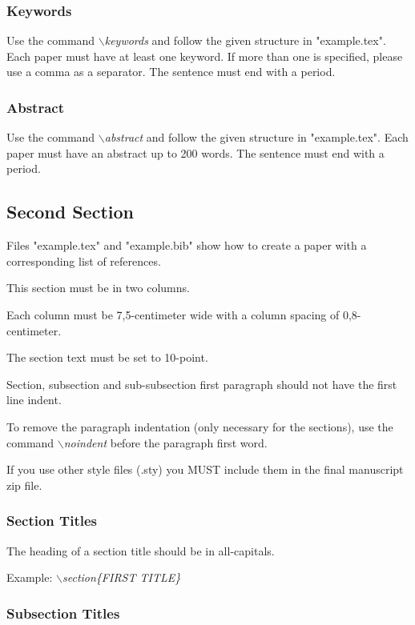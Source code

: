 \documentclass[a4paper,twoside]{article}
\begin{document}
\subsubsection{Keywords}

Use the command \textit{$\backslash$keywords} and follow the given structure in "example.tex". Each paper must have at least one keyword. If more than one is specified, please use a comma as a separator. The sentence must end with a period.

\subsubsection{Abstract}

Use the command \textit{$\backslash$abstract} and follow the given structure in "example.tex".
Each paper must have an abstract up to 200 words. The sentence
must end with a period.

\subsection{Second Section}

Files "example.tex" and "example.bib" show how to create a paper
with a corresponding list of references.

This section must be in two columns.

Each column must be 7,5-centimeter wide with a column spacing
of 0,8-centimeter.

The section text must be set to 10-point.

Section, subsection and sub-subsection first paragraph should not
have the first line indent.

To remove the paragraph indentation (only necessary for the
sections), use the command \textit{$\backslash$noindent} before the
paragraph first word.

If you use other style files (.sty) you MUST include them in the
final manuscript zip file.


\subsubsection{Section Titles}

The heading of a section title should be in all-capitals.

Example: \textit{$\backslash$section\{FIRST TITLE\}}

\subsubsection{Subsection Titles}
\end{document}
